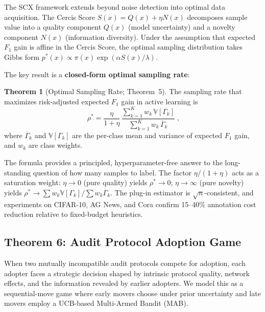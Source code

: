 \documentclass[twocolumn]{article}
\theoremstyle{definition}
\newtheorem{theorem}{Theorem}
\begin{document}
The SCX framework extends beyond noise detection into optimal data acquisition. The Cercis Score $S(x) = Q(x) + \eta N(x)$ decomposes sample value into a quality component $Q(x)$ (model uncertainty) and a novelty component $N(x)$ (information diversity). Under the assumption that expected $F_1$ gain is affine in the Cercis Score, the optimal sampling distribution takes Gibbs form $p^*(x) \propto \pi(x)\exp(\alpha S(x)/\lambda)$.

The key result is a \textbf{closed-form optimal sampling rate}:

\begin{theorem}[Optimal Sampling Rate; Theorem~5]
\label{thm:active}
The sampling rate that maximizes risk-adjusted expected $F_1$ gain in active learning is
\begin{equation}
\boxed{\;
\rho^* = \frac{\eta}{1+\eta}\,
\frac{\sum_{k=1}^{K} w_k\,\mathbb{V}[\Gamma_k]}
{\sum_{k=1}^{K} w_k\,\overline{\Gamma}_k}
\;},
\end{equation}
where $\overline{\Gamma}_k$ and $\mathbb{V}[\Gamma_k]$ are the per-class mean and variance of expected $F_1$ gain, and $w_k$ are class weights.
\end{theorem}

The formula provides a principled, hyperparameter-free answer to the long-standing question of how many samples to label. The factor $\eta/(1+\eta)$ acts as a saturation weight: $\eta \to 0$ (pure quality) yields $\rho^* \to 0$; $\eta \to \infty$ (pure novelty) yields $\rho^* \to \sum w_k\mathbb{V}[\Gamma_k]/\sum w_k\overline{\Gamma}_k$. The plug-in estimator is $\sqrt{n}$-consistent, and experiments on CIFAR-10, AG News, and Cora confirm 15--40\% annotation cost reduction relative to fixed-budget heuristics.

\subsection{Theorem 6: Audit Protocol Adoption Game}

When two mutually incompatible audit protocols compete for adoption, each adopter faces a strategic decision shaped by intrinsic protocol quality, network effects, and the information revealed by earlier adopters. We model this as a sequential-move game where early movers choose under prior uncertainty and late movers employ a UCB-based Multi-Armed Bandit (MAB).
\end{document}
